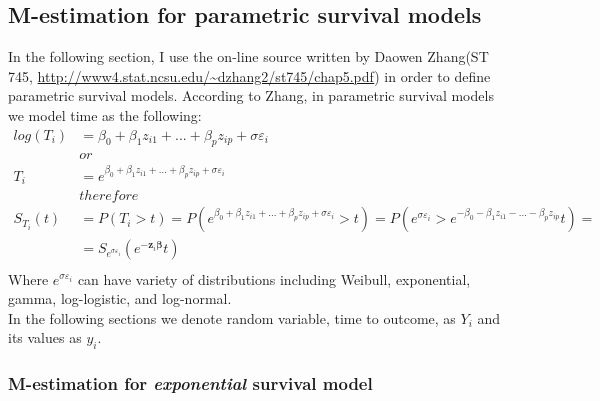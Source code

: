 \documentclass[]{article}
\let\epsilon\varepsilon
\begin{document}
\subsection{M-estimation for parametric survival models}
In the following section, I use the on-line source written by Daowen Zhang(ST 745,  \url{http://www4.stat.ncsu.edu/~dzhang2/st745/chap5.pdf}) in order to define parametric survival models. According to Zhang, in parametric survival models we model time as the following:
  $$
  \begin{aligned}
    log(T_i) &= \beta_0 + \beta_1z_{i1} + ... + \beta_p z_{ip} + \sigma \epsilon_{i}\\
    &or\\
    T_i &= e^{\beta_0 + \beta_1z_{i1} + ... + \beta_p z_{ip} + \sigma \epsilon_{i}}\\
    &therefore\\
    S_{T_i}(t) &= P(T_i>t) = P\left( e^{\beta_0 + \beta_1z_{i1} + ... + \beta_p z_{ip} + \sigma \epsilon_{i}} >t \right ) = P\left( e^{\sigma \epsilon_{i}} > e^{-\beta_0 - \beta_1z_{i1} - ... - \beta_p z_{ip}}t \right )=\\
    &=S_{e^{\sigma \epsilon_{i}}}(e^{-\pmb{z}_i \pmb{\beta}}t)\\
  \end{aligned}
  $$
Where $e^{\sigma \epsilon_{i}}$ can have variety of distributions including Weibull, exponential, gamma, log-logistic, and log-normal.\\
In the following sections we denote random variable, time to outcome, as $Y_i$ and its values as $y_i$. 

\subsubsection{M-estimation for \emph{exponential} survival model}
\label{MEst:exponential}
\end{document}
